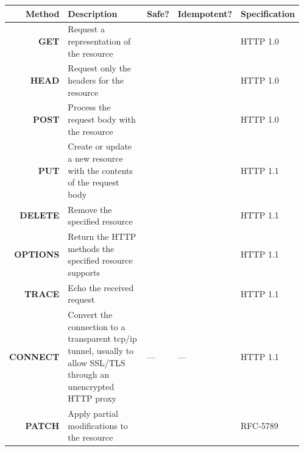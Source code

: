 \documentclass[final]{beamer}
\newcommand{\yes}{\color{green!60!black}{yes}}
\newcommand{\no}{\color{red}{no}}
\newcommand{\method}[1]{\textbf{#1}}
\begin{document}
\begin{frame}{}
    \begin{columns}
      \begin{column}{0.05\textwidth}
      \end{column}
      \begin{column}{0.9\textwidth}
        \begin{block}{}
          \Huge
          \begin{tabular}{r p{} l l l}
            Method & Description & Safe? & Idempotent? & Specification \\ \hline
            \method{GET} & Request a representation of the resource & \yes & \yes & HTTP 1.0 \\
            \method{HEAD} & Request only the headers for the resource & \yes & \yes &HTTP 1.0 \\
            \method{POST} & Process the request body with the resource & \no & \no & HTTP 1.0 \\
            \method{PUT} & Create or update a new resource with the contents of the request body & \no & \yes & HTTP 1.1 \\
            \method{DELETE} & Remove the specified resource & \no & \yes & HTTP 1.1 \\
            \method{OPTIONS} & Return the HTTP methods the specified resource supports & \yes & \yes & HTTP 1.1 \\
            \method{TRACE} & Echo the received request & \yes & \yes & HTTP 1.1 \\
            \method{CONNECT} & Convert the connection to a transparent tcp/ip tunnel, usually to allow SSL/TLS through an unencrypted HTTP proxy & --- & --- & HTTP 1.1 \\
            \method{PATCH} & Apply partial modifications to the resource & \no & \yes & RFC-5789 \\
          \end{tabular}
        \end{block}

        \vspace{0.5in}


\end{column}
\end{columns}
\end{frame}
\end{document}
